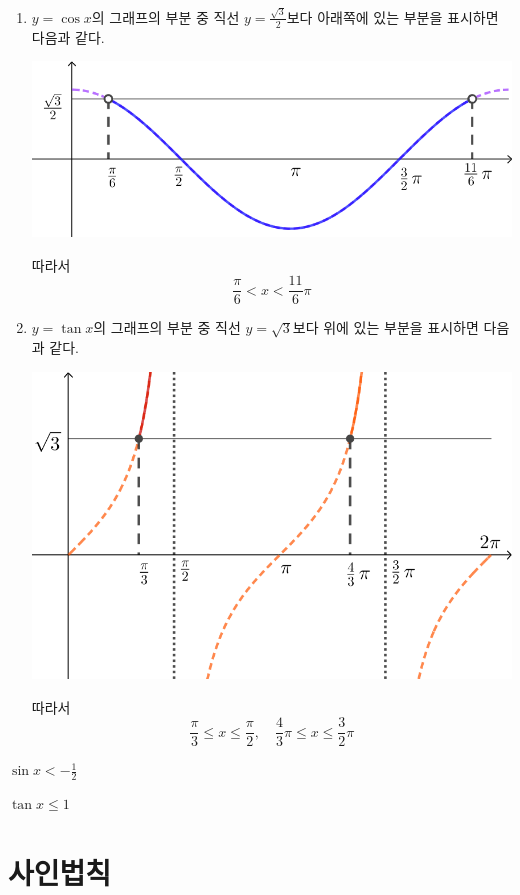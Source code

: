 \documentclass{oblivoir}
\begin{document}
\begin{mdframed}[frametitle=그래프를 사용하는 방법,nobreak=false]
\begin{enumerate}
\item
\(y=\cos x\)의 그래프의 부분 중 직선 \(y=\frac{\sqrt3}2\)보다 아래쪽에 있는 부분을 표시하면 다음과 같다.
\begin{center}
\includegraphics[width=.7\textwidth]{ineq_1-3}
\end{center}
따라서
\[\frac\pi6<x<\frac{11}6\pi\]
\newpage
\item
\(y=\tan x\)의 그래프의 부분 중 직선 \(y=\sqrt3\)보다 위에 있는 부분을 표시하면 다음과 같다.
\begin{center}
\includegraphics[width=.7\textwidth]{ineq_1-4}
\end{center}
따라서
\[\frac\pi3\le x\le\frac\pi2,\quad\frac43\pi\le x\le\frac32\pi\]
\end{enumerate}
\end{mdframed}

%
\label{ineq2}
\begin{enumerate*}[itemjoin=\tabto{.5\textwidth}]
\item
\(\sin x<-\frac12\)
\item
\(\tan x\le1\)
\end{enumerate*}

\section{사인법칙}
\end{document}
